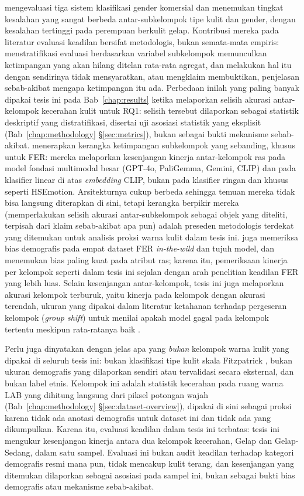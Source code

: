\citet{buolamwini2018gender} mengevaluasi tiga sistem klasifikasi gender komersial dan menemukan tingkat kesalahan yang sangat berbeda antar-subkelompok tipe kulit dan gender, dengan kesalahan tertinggi pada perempuan berkulit gelap. Kontribusi mereka pada literatur evaluasi keadilan bersifat metodologis, bukan semata-mata empiris: menstratifikasi evaluasi berdasarkan variabel subkelompok memunculkan ketimpangan yang akan hilang ditelan rata-rata agregat, dan melakukan hal itu dengan sendirinya tidak mensyaratkan, atau mengklaim membuktikan, penjelasan sebab-akibat mengapa ketimpangan itu ada. Perbedaan inilah yang paling banyak dipakai tesis ini pada Bab~\ref{chap:results} ketika melaporkan selisih akurasi antar-kelompok kecerahan kulit untuk RQ1: selisih tersebut dilaporkan sebagai statistik deskriptif yang distratifikasi, disertai uji asosiasi statistik yang eksplisit (Bab~\ref{chap:methodology} \S\ref{sec:metrics}), bukan sebagai bukti mekanisme sebab-akibat. \citet{chhua2024bias} menerapkan kerangka ketimpangan subkelompok yang sebanding, khusus untuk FER: mereka melaporkan kesenjangan kinerja antar-kelompok ras pada model fondasi multimodal besar (GPT-4o, PaliGemma, Gemini, CLIP) dan pada klasifier linear di atas \textit{embedding} CLIP, bukan pada klasifier ringan dan khusus seperti HSEmotion. Arsitekturnya cukup berbeda sehingga temuan mereka tidak bisa langsung diterapkan di sini, tetapi kerangka berpikir mereka (memperlakukan selisih akurasi antar-subkelompok sebagai objek yang diteliti, terpisah dari klaim sebab-akibat apa pun) adalah preseden metodologis terdekat yang ditemukan untuk analisis proksi warna kulit dalam tesis ini. \citet{hosseini2025faces} juga memeriksa bias demografis pada empat dataset FER \textit{in-the-wild} dan tujuh model, dan menemukan bias paling kuat pada atribut ras; karena itu, pemeriksaan kinerja per kelompok seperti dalam tesis ini sejalan dengan arah penelitian keadilan FER yang lebih luas. Selain kesenjangan antar-kelompok, tesis ini juga melaporkan akurasi kelompok terburuk, yaitu kinerja pada kelompok dengan akurasi terendah, ukuran yang dipakai dalam literatur ketahanan terhadap pergeseran kelompok (\textit{group shift}) untuk menilai apakah model gagal pada kelompok tertentu meskipun rata-ratanya baik \citep{sagawa2020dro}.

Perlu juga dinyatakan dengan jelas apa yang \emph{bukan} kelompok warna kulit yang dipakai di seluruh tesis ini: bukan klasifikasi tipe kulit skala Fitzpatrick \citep{fitzpatrick1988validity}, bukan ukuran demografis yang dilaporkan sendiri atau tervalidasi secara eksternal, dan bukan label etnis. Kelompok ini adalah statistik kecerahan pada ruang warna LAB yang dihitung langsung dari piksel potongan wajah (Bab~\ref{chap:methodology} \S\ref{sec:dataset-overview}), dipakai di sini sebagai proksi karena tidak ada anotasi demografis untuk dataset ini dan tidak ada yang dikumpulkan. Karena itu, evaluasi keadilan dalam tesis ini terbatas: tesis ini mengukur kesenjangan kinerja antara dua kelompok kecerahan, Gelap dan Gelap-Sedang, dalam satu sampel. Evaluasi ini bukan audit keadilan terhadap kategori demografis resmi mana pun, tidak mencakup kulit terang, dan kesenjangan yang ditemukan dilaporkan sebagai asosiasi pada sampel ini, bukan sebagai bukti bias demografis atau mekanisme sebab-akibat.

